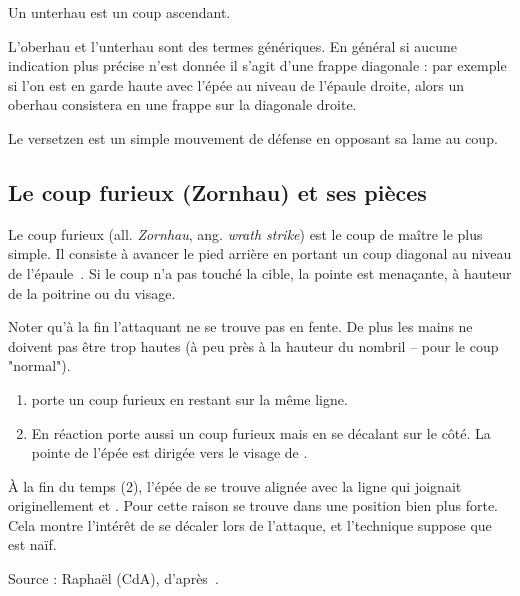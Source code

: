 \begin{coup}[Unterhau]
\label{épée-longue:coup:unterhau}

Un unterhau est un coup ascendant.

\end{coup}

L'oberhau et l'unterhau sont des termes génériques.
En général si aucune indication plus précise n'est donnée il s'agit d'une frappe diagonale : par exemple si l'on est en garde haute avec l'épée au niveau de l'épaule droite, alors un oberhau consistera en une frappe sur la diagonale droite.

\begin{garde}[Versetzen]

Le versetzen est un simple mouvement de défense en opposant sa lame au coup.

\end{garde}



\subsection{Le coup furieux (Zornhau) et ses pièces}



\begin{coup}

Le coup furieux (all. \emph{Zornhau}, ang. \emph{wrath strike}) est le coup de maître le plus simple.
Il consiste à avancer le pied arrière en portant un coup diagonal au niveau de l'épaule~\cite[fol.~19r-20v, p.~16]{farrell:ringeck}.
Si le coup n'a pas touché la cible, la pointe est menaçante, à hauteur de la poitrine ou du visage.

\end{coup}


Noter qu'à la fin l'attaquant ne se trouve pas en fente.
De plus les mains ne doivent pas être trop hautes (à peu près à la hauteur du nombril – pour le coup "normal").


\begin{technique}

\begin{enumerate}
	\item \A porte un coup furieux en restant sur la même ligne.
	
	\item En réaction \D porte aussi un coup furieux mais en se décalant sur le côté.
	La pointe de l'épée est dirigée vers le visage de \A.
\end{enumerate}

À la fin du temps (2), l'épée de \D se trouve alignée avec la ligne qui joignait originellement \A et \D.
Pour cette raison \D se trouve dans une position bien plus forte.
Cela montre l'intérêt de se décaler lors de l'attaque, et l'technique suppose que \A est naïf.

Source : Raphaël (CdA), d'après~\cite[fol.~19r-20v, §1, p.~16]{farrell:ringeck}.
\end{technique}


